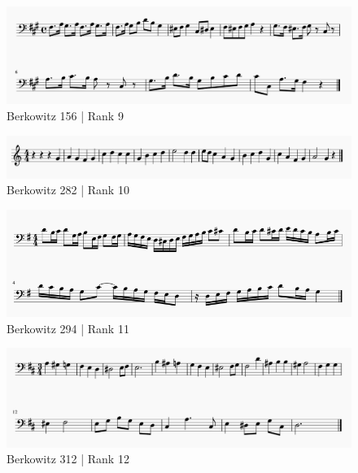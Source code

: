 \documentclass[]{book}
\begin{document}
\begin{figure}

{\centering \includegraphics[width=1\linewidth]{img/survey_melodies/Berkowitz156} 

}

\caption{Berkowitz 156 | Rank 9}\label{fig:berk156}
\end{figure}

\begin{figure}

{\centering \includegraphics[width=1\linewidth]{img/survey_melodies/Berkowitz282} 

}

\caption{Berkowitz 282 | Rank 10}\label{fig:berk282}
\end{figure}

\begin{figure}

{\centering \includegraphics[width=1\linewidth]{img/survey_melodies/Berkowitz294} 

}

\caption{Berkowitz 294 | Rank 11}\label{fig:berk294}
\end{figure}

\begin{figure}

{\centering \includegraphics[width=1\linewidth]{img/survey_melodies/Berkowitz312} 

}

\caption{Berkowitz 312 | Rank 12}\label{fig:berk312}
\end{figure}
\end{document}
